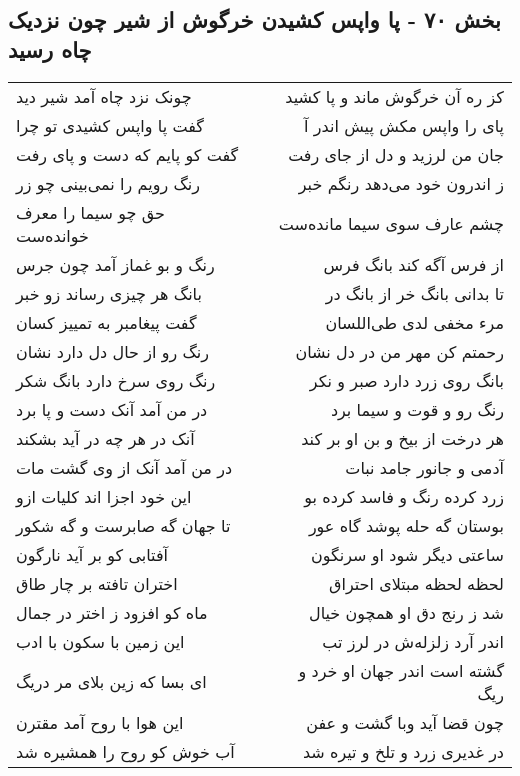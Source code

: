 \begin{center}
\section*{بخش ۷۰ - پا واپس کشیدن خرگوش از شیر چون نزدیک چاه رسید}
\label{sec:sh070}
\begin{longtable}{l p{0.5cm} r}
چونک نزد چاه آمد شیر دید
&&
کز ره آن خرگوش ماند و پا کشید
\\
گفت پا واپس کشیدی تو چرا
&&
پای را واپس مکش پیش اندر آ
\\
گفت کو پایم که دست و پای رفت
&&
جان من لرزید و دل از جای رفت
\\
رنگ رویم را نمی‌بینی چو زر
&&
ز اندرون خود می‌دهد رنگم خبر
\\
حق چو سیما را معرف خوانده‌ست
&&
چشم عارف سوی سیما مانده‌ست
\\
رنگ و بو غماز آمد چون جرس
&&
از فرس آگه کند بانگ فرس
\\
بانگ هر چیزی رساند زو خبر
&&
تا بدانی بانگ خر از بانگ در
\\
گفت پیغامبر به تمییز کسان
&&
مرء مخفی لدی طی‌اللسان
\\
رنگ رو از حال دل دارد نشان
&&
رحمتم کن مهر من در دل نشان
\\
رنگ روی سرخ دارد بانگ شکر
&&
بانگ روی زرد دارد صبر و نکر
\\
در من آمد آنک دست و پا برد
&&
رنگ رو و قوت و سیما برد
\\
آنک در هر چه در آید بشکند
&&
هر درخت از بیخ و بن او بر کند
\\
در من آمد آنک از وی گشت مات
&&
آدمی و جانور جامد نبات
\\
این خود اجزا اند کلیات ازو
&&
زرد کرده رنگ و فاسد کرده بو
\\
تا جهان گه صابرست و گه شکور
&&
بوستان گه حله پوشد گاه عور
\\
آفتابی کو بر آید نارگون
&&
ساعتی دیگر شود او سرنگون
\\
اختران تافته بر چار طاق
&&
لحظه لحظه مبتلای احتراق
\\
ماه کو افزود ز اختر در جمال
&&
شد ز رنج دق او همچون خیال
\\
این زمین با سکون با ادب
&&
اندر آرد زلزله‌ش در لرز تب
\\
ای بسا که زین بلای مر دریگ
&&
گشته است اندر جهان او خرد و ریگ
\\
این هوا با روح آمد مقترن
&&
چون قضا آید وبا گشت و عفن
\\
آب خوش کو روح را همشیره شد
&&
در غدیری زرد و تلخ و تیره شد
\\

\end{longtable}
\end{center}
